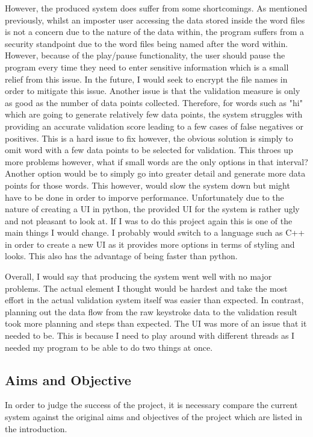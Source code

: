 \documentclass[10pt,a4paper]{report}
\begin{document}
However, the produced system does suffer from some shortcomings. As mentioned previously, whilst an imposter user accessing the data stored inside the word files is not a concern due to the nature of the data within, the program suffers from a security standpoint due to the word files being named after the word within. However, because of the play/pause functionality, the user should pause the program every time they need to enter sensitive information which is a small relief from this issue. In the future, I would seek to encrypt the file names in order to mitigate this issue. Another issue is that the validation measure is only as good as the number of data points collected. Therefore, for words such as "hi" which are going to generate relatively few data points, the system struggles with providing an accurate validation score leading to a few cases of false negatives or positives. This is a hard issue to fix however, the obvious solution is simply to omit word with a few data points to be selected for validation. This throes up more problems however, what if small words are the only options in that interval? Another option would be to simply go into greater detail and generate more data points for those words. This however, would slow the system down but might have to be done in order to imporve performance. Unfortunately due to the nature of creating a UI in python, the provided UI for the system is rather ugly and not pleasant to look at. If I was to do this project again this is one of the main things I would change. I probably would switch to a language such as C++ in order to create a new UI as it provides more options in terms of styling and looks. This also has the advantage of being faster than python.

Overall, I would say that producing the system went well with no major problems. The actual element I thought would be hardest and take the most effort in the actual validation system itself was easier than expected. In contrast, planning out the data flow from the raw keystroke data to the validation result took more planning and steps than expected. The UI was more of an issue that it needed to be. This is because  I need to play around with different threads as I needed my program to be able to do two things at once. 

\subsection{Aims and Objective}

In order to judge the success of the project, it is necessary compare the current system against the original aims and objectives of the project which are listed in the introduction.
\end{document}
